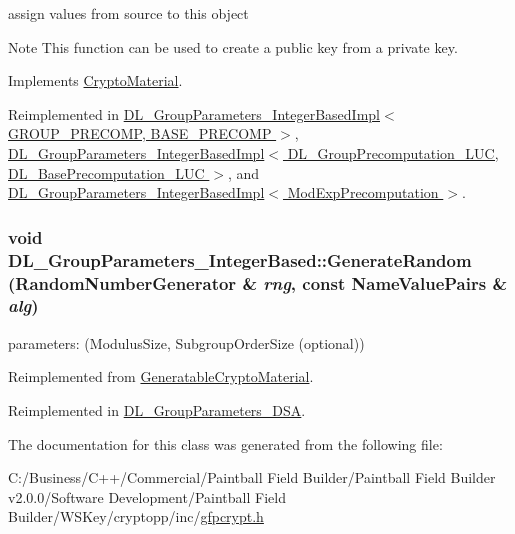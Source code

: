 assign values from source to this object \begin{DoxyNote}{Note}
This function can be used to create a public key from a private key. 
\end{DoxyNote}


Implements \hyperlink{class_crypto_material_a20181c1b39a74a9fe91385b025b773c6}{CryptoMaterial}.

Reimplemented in \hyperlink{class_d_l___group_parameters___integer_based_impl_a0d668d2148cf57078a93f3a5a4b4ac2a}{DL\_\-GroupParameters\_\-IntegerBasedImpl$<$ GROUP\_\-PRECOMP, BASE\_\-PRECOMP $>$}, \hyperlink{class_d_l___group_parameters___integer_based_impl_a0d668d2148cf57078a93f3a5a4b4ac2a}{DL\_\-GroupParameters\_\-IntegerBasedImpl$<$ DL\_\-GroupPrecomputation\_\-LUC, DL\_\-BasePrecomputation\_\-LUC $>$}, and \hyperlink{class_d_l___group_parameters___integer_based_impl_a0d668d2148cf57078a93f3a5a4b4ac2a}{DL\_\-GroupParameters\_\-IntegerBasedImpl$<$ ModExpPrecomputation $>$}.\hypertarget{class_d_l___group_parameters___integer_based_a8c9a79c493a215ca37408bb7ddfb5533}{
\subsubsection[{GenerateRandom}]{\setlength{\rightskip}{0pt plus 5cm}void DL\_\-GroupParameters\_\-IntegerBased::GenerateRandom ({\bf RandomNumberGenerator} \& {\em rng}, \/  const {\bf NameValuePairs} \& {\em alg})}}
\label{class_d_l___group_parameters___integer_based_a8c9a79c493a215ca37408bb7ddfb5533}
parameters: (ModulusSize, SubgroupOrderSize (optional)) 

Reimplemented from \hyperlink{class_generatable_crypto_material_abe368b52db1ca7079b690f2d6e605f7a}{GeneratableCryptoMaterial}.

Reimplemented in \hyperlink{class_d_l___group_parameters___d_s_a_ac83d3668c342b3a1fb367ed7785e27a3}{DL\_\-GroupParameters\_\-DSA}.

The documentation for this class was generated from the following file:\begin{DoxyCompactItemize}
\item 
C:/Business/C++/Commercial/Paintball Field Builder/Paintball Field Builder v2.0.0/Software Development/Paintball Field Builder/WSKey/cryptopp/inc/\hyperlink{gfpcrypt_8h}{gfpcrypt.h}\end{DoxyCompactItemize}

